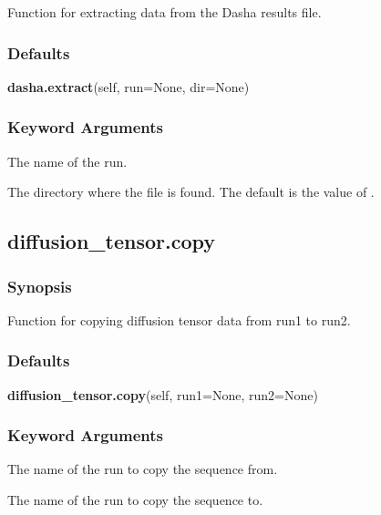  Function for extracting data from the Dasha results file. 
  

  
 \subsubsection{Defaults} 

 \textsf{\textbf{dasha.extract}(self, run=None, dir=None)} 

  
 \subsubsection{Keyword Arguments} 

   The name of the run.   

   The directory where the file  is found.  The default is the value of .  

  

  

 \newpage 

 \subsection{diffusion\_tensor.copy} 

  
 \subsubsection{Synopsis} 

 Function for copying diffusion tensor data from run1 to run2. 
  

  
 \subsubsection{Defaults} 

 \textsf{\textbf{diffusion\_tensor.copy}(self, run1=None, run2=None)} 

  
 \subsubsection{Keyword Arguments} 

   The name of the run to copy the sequence from.   

   The name of the run to copy the sequence to.  

